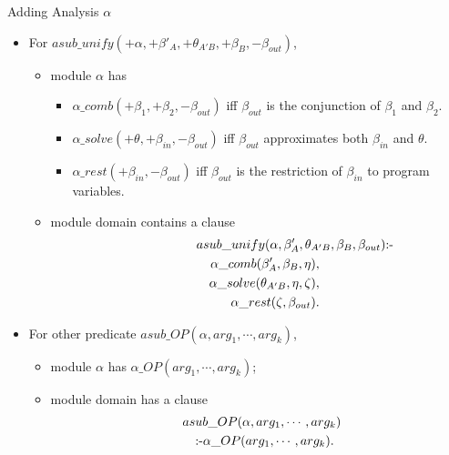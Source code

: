 \documentclass[landscape]{slides}
\begin{document}
 \begin{slide}{Adding Analysis $\alpha$}


 \begin{itemize}
 \item For $asub\_unify(+\alpha,+\beta'_{A},+\theta_{A'B},+\beta_{B},-\beta_{out})$,
 \begin{itemize}
 \item  module $\alpha$ has 
 \begin{itemize}
 \item $\alpha\_comb(+\beta_1,+\beta_2,-\beta_{out})$ iff
 $\beta_{out}$ is the conjunction of $\beta_1$ and $\beta_2$.       
 \item $\alpha\_solve(+\theta,+\beta_{in},-\beta_{out})$  iff 
 $\beta_{out}$ approximates 
 both $\beta_{in}$ and  $\theta$.  
 \item $\alpha\_rest(+\beta_{in},-\beta_{out})$ iff $\beta_{out}$ is the
 restriction of $\beta_{in}$ to program variables. 
 \end{itemize} 
 \item module {\sf domain} contains a clause
 \begin{eqnarray*}
 \lefteqn{
  asub\_unify(\alpha,\beta'_{A},\theta_{A'B},\beta_{B},\beta_{out}) \mbox{:-}}\\
 &&  \alpha\_comb(\beta'_{A},\beta_{B},\eta),\\
 &&  \alpha\_solve(\theta_{A'B},\eta,\zeta),\\
 &&  \alpha\_rest(\zeta,\beta_{out}).
 \end{eqnarray*}
 \end{itemize}

 \item For other predicate $asub\_OP(\alpha,arg_1,\cdots,arg_k)$,
 \begin{itemize} 
 \item module $\alpha$ has  $\alpha\_OP(arg_1,\cdots,arg_k)$;
 \item module {\sf domain} has a clause 
 \begin{eqnarray*}
 \lefteqn{asub\_OP(\alpha,arg_1,\cdots,arg_k)}\\
  && \mbox{:-} \alpha\_OP(arg_1,\cdots,arg_k).
 \end{eqnarray*}
 \end{itemize} 
 \end{itemize}

 \end{slide}
\end{document}
